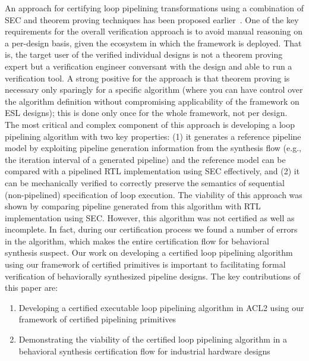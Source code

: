 An approach for certifying loop pipelining transformations using a combination of SEC and 
theorem proving techniques has been proposed earlier~\cite{hrx:dac-12}. 
 One of the key requirements for the overall verification approach is to avoid 
 manual reasoning on a per-design basis, given the ecosystem in which the framework is deployed.  
 That is, the target user of the verified individual designs is not a theorem proving expert but 
 a verification engineer conversant with the design and able to run a verification tool.  A strong positive 
 for the approach is that theorem proving is necessary only sparingly for a specific algorithm 
 (where you can have control over the algorithm definition without compromising applicability of the framework on ESL designs); 
 this is done only once for the whole framework, not per design. 
The most critical and complex
component of this approach is developing
a loop pipelining algorithm with two key properties: (1) it generates a reference pipeline model 
by exploiting pipeline generation information from the synthesis flow (e.g., the iteration interval 
of a generated pipeline) and the reference model can be compared with a pipelined RTL 
implementation using SEC effectively, and (2) it can be mechanically verified to correctly preserve the semantics of
sequential (non-pipelined) specification of loop execution. The viability of 
this approach was shown by comparing pipeline generated from this algorithm with RTL implementation 
using SEC. However, this algorithm was not certified as well as incomplete. 
In fact, during our certification process we found a number of errors in the algorithm, 
which makes the entire certification flow for behavioral synthesis suspect. 
Our work on developing a certified loop pipelining algorithm using our framework of certified 
primitives is important to facilitating formal verification of behaviorally synthesized
 pipeline designs.
\medskip
The key contributions of this paper are:
\begin{enumerate}
\item Developing a certified executable loop pipelining algorithm in ACL2 using our framework of certified pipelining primitives 
\item Demonstrating the viability of the certified loop pipelining algorithm in a behavioral synthesis certification flow for industrial hardware designs
\end{enumerate}

